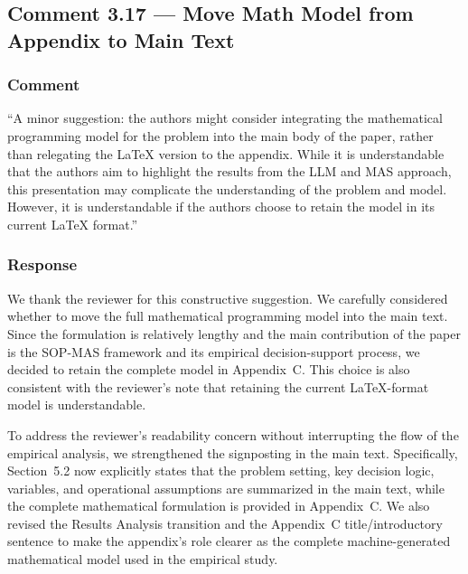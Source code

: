 \documentclass[11pt,a4paper]{article}
\begin{document}
\subsection{Comment 3.17 --- Move Math Model from Appendix to Main Text}

\subsubsection{Comment}
``A minor suggestion: the authors might consider integrating the mathematical programming model for the problem into the main body of the paper, rather than relegating the LaTeX version to the appendix. While it is understandable that the authors aim to highlight the results from the LLM and MAS approach, this presentation may complicate the understanding of the problem and model. However, it is understandable if the authors choose to retain the model in its current LaTeX format.''

\subsubsection{Response}
We thank the reviewer for this constructive suggestion. We carefully considered whether to move the full mathematical programming model into the main text. Since the formulation is relatively lengthy and the main contribution of the paper is the SOP-MAS framework and its empirical decision-support process, we decided to retain the complete model in Appendix~C. This choice is also consistent with the reviewer's note that retaining the current LaTeX-format model is understandable.

To address the reviewer's readability concern without interrupting the flow of the empirical analysis, we strengthened the signposting in the main text. Specifically, Section~5.2 now explicitly states that the problem setting, key decision logic, variables, and operational assumptions are summarized in the main text, while the complete mathematical formulation is provided in Appendix~C. We also revised the Results Analysis transition and the Appendix~C title/introductory sentence to make the appendix's role clearer as the complete machine-generated mathematical model used in the empirical study.
\end{document}
